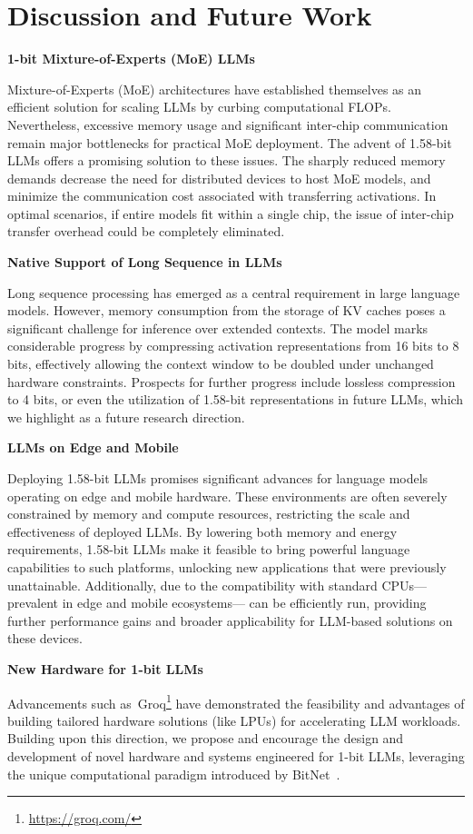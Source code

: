 \section{Discussion and Future Work}

\textbf{1-bit Mixture-of-Experts (MoE) LLMs}

Mixture-of-Experts (MoE) architectures have established themselves as an efficient solution for scaling LLMs by curbing computational FLOPs. Nevertheless, excessive memory usage and significant inter-chip communication remain major bottlenecks for practical MoE deployment. The advent of 1.58-bit LLMs offers a promising solution to these issues. The sharply reduced memory demands decrease the need for distributed devices to host MoE models, and minimize the communication cost associated with transferring activations. In optimal scenarios, if entire models fit within a single chip, the issue of inter-chip transfer overhead could be completely eliminated.

\textbf{Native Support of Long Sequence in LLMs}

Long sequence processing has emerged as a central requirement in large language models. However, memory consumption from the storage of KV caches poses a significant challenge for inference over extended contexts. The  model marks considerable progress by compressing activation representations from 16 bits to 8 bits, effectively allowing the context window to be doubled under unchanged hardware constraints. Prospects for further progress include lossless compression to 4 bits, or even the utilization of 1.58-bit representations in future LLMs, which we highlight as a future research direction.

\textbf{LLMs on Edge and Mobile}

Deploying 1.58-bit LLMs promises significant advances for language models operating on edge and mobile hardware. These environments are often severely constrained by memory and compute resources, restricting the scale and effectiveness of deployed LLMs. By lowering both memory and energy requirements, 1.58-bit LLMs make it feasible to bring powerful language capabilities to such platforms, unlocking new applications that were previously unattainable. Additionally, due to the compatibility with standard CPUs—prevalent in edge and mobile ecosystems— can be efficiently run, providing further performance gains and broader applicability for LLM-based solutions on these devices.

\textbf{New Hardware for 1-bit LLMs}

Advancements such as~Groq\footnote{\url{https://groq.com/}} have demonstrated the feasibility and advantages of building tailored hardware solutions (like LPUs) for accelerating LLM workloads. Building upon this direction, we propose and encourage the design and development of novel hardware and systems engineered for 1-bit LLMs, leveraging the unique computational paradigm introduced by BitNet~\cite{bitnet}.